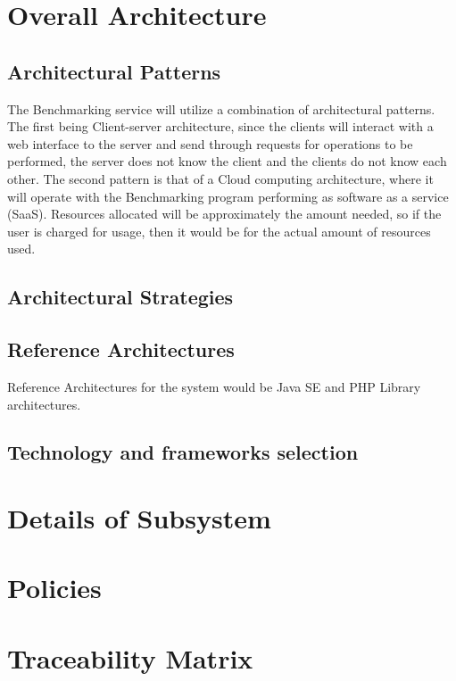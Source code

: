 \documentclass[runningheads,a4paper]{article}
\begin{document}
\section{Overall Architecture}
\subsection{Architectural Patterns}
The Benchmarking service will utilize a combination of architectural patterns. The first being Client-server architecture, since the clients will interact with a web interface to the server and send through requests for operations to be performed, the server does not know the client and the clients do not know each other. The second pattern is that of a Cloud computing architecture, where it will operate with the Benchmarking program performing as software as a service (SaaS). Resources allocated will be approximately the amount needed, so if the user is charged for usage, then it would be for the actual amount of resources used.\\

\subsection{Architectural Strategies}

\subsection{Reference Architectures}
Reference Architectures for the system would be Java SE and PHP Library architectures. 

\subsection{Technology and frameworks selection}

\section{Details of Subsystem}

\section{Policies}

\section{Traceability Matrix}
\end{document}

